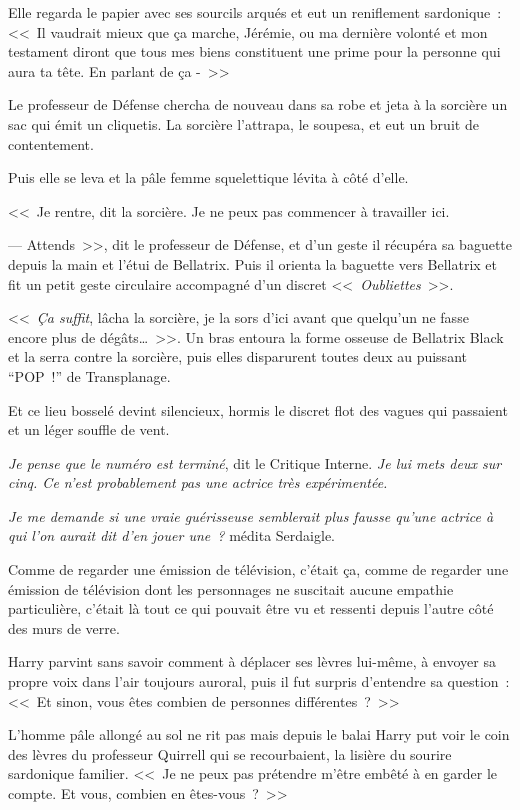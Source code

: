 Elle regarda le papier avec ses sourcils arqués et eut un reniflement sardonique~: <<~Il vaudrait mieux que ça marche, Jérémie, ou ma dernière volonté et mon testament diront que tous mes biens constituent une prime pour la personne qui aura ta tête. En parlant de ça -~>>

Le professeur de Défense chercha de nouveau dans sa robe et jeta à la sorcière un sac qui émit un cliquetis. La sorcière l'attrapa, le soupesa, et eut un bruit de contentement.

Puis elle se leva et la pâle femme squelettique lévita à côté d'elle.

<<~Je rentre, dit la sorcière. Je ne peux pas commencer à travailler ici.

--- Attends~>>, dit le professeur de Défense, et d'un geste il récupéra sa baguette depuis la main et l'étui de Bellatrix. Puis il orienta la baguette vers Bellatrix et fit un petit geste circulaire accompagné d'un discret <<~\emph{Oubliettes}~>>.

<<~\emph{Ça suffit}, lâcha la sorcière, je la sors d'ici avant que quelqu'un ne fasse encore plus de dégâts…~>>. Un bras entoura la forme osseuse de Bellatrix Black et la serra contre la sorcière, puis elles disparurent toutes deux au puissant “POP~!” de Transplanage.

Et ce lieu bosselé devint silencieux, hormis le discret flot des vagues qui passaient et un léger souffle de vent.

\emph{Je pense que le numéro est terminé}, dit le Critique Interne. \emph{Je lui mets deux sur cinq. Ce n'est probablement pas une actrice très expérimentée.}

\emph{Je me demande si une vraie guérisseuse semblerait plus fausse qu'une actrice à qui l'on aurait dit d'en jouer une~?} médita Serdaigle.

Comme de regarder une émission de télévision, c'était ça, comme de regarder une émission de télévision dont les personnages ne suscitait aucune empathie particulière, c'était là tout ce qui pouvait être vu et ressenti depuis l'autre côté des murs de verre.

Harry parvint sans savoir comment à déplacer ses lèvres lui-même, à envoyer sa propre voix dans l'air toujours auroral, puis il fut surpris d'entendre sa question~: <<~Et sinon, vous êtes combien de personnes différentes~?~>>

L'homme pâle allongé au sol ne rit pas mais depuis le balai Harry put voir le coin des lèvres du professeur Quirrell qui se recourbaient, la lisière du sourire sardonique familier. <<~Je ne peux pas prétendre m'être embêté à en garder le compte. Et vous, combien en êtes-vous~?~>>

